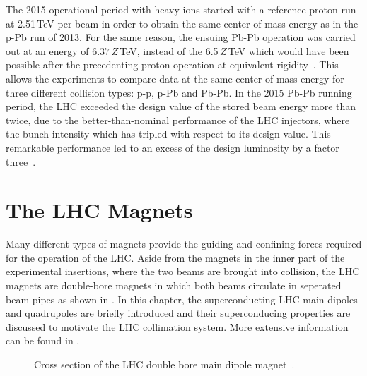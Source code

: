 The 2015 operational period with heavy ions started with a reference proton run at 2.51$\,$TeV per beam in order to obtain the same center of mass energy as in the p-Pb run of 2013. For the same reason, the ensuing Pb-Pb operation was carried out at an energy of $6.37\,Z\,$TeV, instead of the 6.5$\,Z\,$TeV which would have been possible after the precedenting proton operation at equivalent rigidity~\cite{IPAC16:TUPMW027}. This allows the experiments to compare data at the same center of mass energy for three different collision types: p-p, p-Pb and Pb-Pb. In the 2015 Pb-Pb running period, the LHC exceeded the design value of the stored \lead beam energy more than twice, due to the better-than-nominal performance of the LHC injectors, where the bunch intensity which has tripled with respect to its design value. This remarkable performance led to an excess of the design luminosity by a factor three~\cite{IPAC16:TUPMW027}.

\section{The LHC Magnets}

Many different types of magnets provide the guiding and confining forces required for the operation of the LHC. Aside from the magnets in the inner part of the experimental insertions, where the two beams are brought into collision, the LHC magnets are double-bore magnets in which both beams circulate in seperated beam pipes as shown in . In this chapter, the superconducting LHC main dipoles and quadrupoles are briefly introduced and their superconducing properties are discussed to motivate the LHC collimation system. More extensive information can be found in \citedr.

\begin{figure}[b]
  \centering
  \caption{Cross section of the LHC double bore main dipole magnet~\cite{Valeriane:843195}.}  
  \label{pic:16070405}
  \end{figure}


